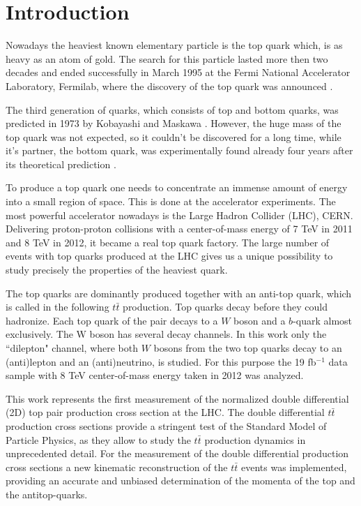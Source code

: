 \chapter{Introduction}

Nowadays the heaviest known elementary particle is the top quark which, is as heavy as an atom of gold. 
The search for this particle lasted more then two decades and ended successfully 
in March 1995 at the Fermi National Accelerator Laboratory, Fermilab, where 
the discovery of the top quark was announced \cite{PhysRevLett.74.2626}. 

The third generation of quarks, which consists of top and bottom quarks, 
was predicted in 1973 by Kobayashi and Maskawa \cite{Kobayashi:1973fv}. However, the huge mass of the 
top quark was not expected, so it couldn't be discovered for a long time, while it's partner, 
the bottom quark, was experimentally found already four years after its theoretical prediction \cite{PhysRevLett.39.252}. 

To produce a top quark one needs to concentrate an immense amount of energy 
into a small region of space. This is done at the accelerator experiments. 
The most powerful accelerator nowadays is the Large Hadron Collider (LHC), CERN. 
Delivering proton-proton collisions with a center-of-mass energy of 7 TeV in 2011 and 8 TeV in 2012, 
it became a real top quark factory. The large number of events with top quarks
produced at the LHC gives us a unique possibility to study precisely the properties of the heaviest quark. 

The top quarks are dominantly produced together with an anti-top quark, which is called in the 
following $t\bar{t}$ production. Top quarks decay before they could hadronize. 
Each top quark of the pair decays to a $W$ boson and a $b$-quark almost exclusively. 
The W boson has several decay channels. In this work only the ``dilepton" channel, 
where both $W$ bosons from the two top quarks decay to an (anti)lepton and an (anti)neutrino, is studied. 
For this purpose the 19 fb$^{-1}$ data sample with 8 TeV center-of-mass energy taken in 2012 was analyzed.

This work represents the first measurement of the normalized double differential (2D) top pair production
cross section at the LHC. The double differential $t\bar{t}$ production cross sections provide a stringent test of the 
Standard Model of Particle Physics, as they allow to study the $t\bar{t}$ production dynamics in unprecedented
detail. For the measurement of the double differential production cross sections a new kinematic reconstruction
of the $t\bar{t}$ events was implemented, providing an accurate and unbiased determination of the momenta of the
top and the antitop-quarks.

